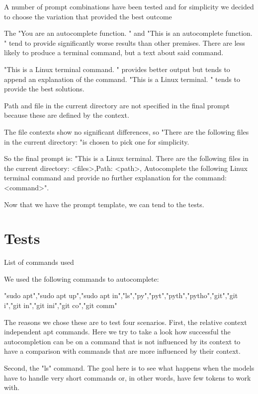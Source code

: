  

A number of prompt combinations have been tested and for simplicity we decided to choose the variation that provided the best outcome 



The "You are an autocomplete function. " and "This is an autocomplete function. " tend to provide significantly worse results than other premises. There are less likely to produce a terminal command, but a text about said command.


"This is a Linux terminal command. " provides better output but tends to append an explanation of the command. "This is a Linux terminal. " tends to provide the best solutions. 




Path and file in the current directory are not specified in the final prompt because these are defined by the context.



The file contexts show no significant differences, so "There are the following files in the current  directory: "is chosen to pick one for simplicity.




So the final prompt is: "This is a Linux terminal. There are the following files in the current  directory: <files>,Path: <path>, Autocomplete the following Linux terminal command and provide no further explanation for the command: <command>".



Now that we have the prompt template, we can tend to the tests.

\section{Tests}
List of commands used

We used the following commands to autocomplete:

"sudo apt","sudo apt up","sudo apt in","ls","py","pyt","pyth","pytho","git","git i","git in","git ini","git co","git comm"


The reasons we chose these are to test four scenarios. First, the relative context independent apt commands. Here we try to take a look how successful the autocompletion can be on a command that is not influenced by its context to have a comparison with commands that are more influenced by their context.



Second, the  "ls" command. The goal here is to see what happens when the models have to handle very short commands or, in other words, have few tokens to work with.



